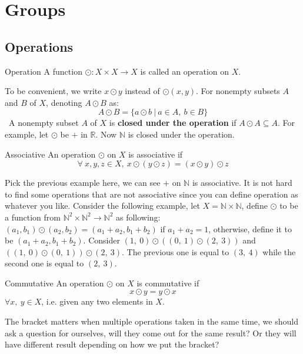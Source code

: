 \documentclass{article}
\begin{document}
\section{Groups}
\subsection{Operations}
\begin{defin}{Operation}
    A function $\odot : X \times X \rightarrow X$ is called an operation on $X$.
\end{defin}
To be convenient, we write $x\odot y$ instead of $\odot(x,y)$. For nonempty subsets $A$ and $B$ of $X$, denoting $A \odot B$ as:
$$
A \odot B = \{a \odot b\ |\ a \in A,\ b \in B\}
$$
\quad\ A nonempty subset $A$ of $X$ is \textbf{closed under the operation} if $A \odot A \subseteq A$. For example, let $\odot$ be
$+$ in $\mathbb{R}$. Now $\mathbb{N}$ is closed under the operation.
\begin{defin}{Associative}
    An operation $\odot$ on $X$ is associative if
    $$
    \forall\ x, y, z \in X,\  x \odot (y \odot z) = (x \odot y) \odot z
    $$
\end{defin}
Pick the previous example here, we can see $+$ on $\mathbb{N}$ is associative. It is not hard to find some operations that are not associative
since you can define operation as whatever you like. Consider the following example, let $X = \mathbb{N} \times \mathbb{N}$, define $\odot$
to be a function from $\mathbb{N}^2 \times \mathbb{N}^2 \rightarrow \mathbb{N}^2$ as following: $(a_1, b_1) \odot (a_2, b_2) = (a_1 + a_2, b_1 + b_2)$
if $a_1 + a_2 = 1$, otherwise, define it to be $(a_1 + a_2, b_1 + b_2)$. Consider $(1,\ 0)\odot \left((0,\ 1) \odot (2,\ 3)\right)$ and $\left((1,\ 0)\odot (0,\ 1)\right)\odot (2,\ 3)$.
The previous one is equal to $(3,\ 4)$ while the second one is equal to $(2,\ 3)$.
\begin{defin}{Commutative}
    An operation $\odot$ on $X$ is commutative if
    $$
    x \odot y = y \odot x
    $$
    $\forall x,\ y \in X$, i.e. given any two elements in $X$.
\end{defin}
The bracket matters when multiple operations taken in the same time, we should ask a question for ourselves, will they come out for the same result? Or they will have different
result depending on how we put the bracket?\\
\end{document}
